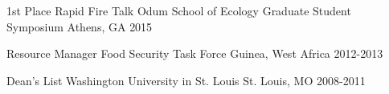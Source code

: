 



\begin{cvhonors}
  \cvhonor
    {1st Place Rapid Fire Talk} %
    {Odum School of Ecology Graduate Student Symposium} %
    {Athens, GA} %
    {2015} %

  \cvhonor
    {Resource Manager} %
    {Food Security Task Force} %
    {Guinea, West Africa} %
    {2012-2013} %

  \cvhonor
    {Dean's List} %
    {Washington University in St. Louis} %
    {St. Louis, MO} %
    {2008-2011} %

\end{cvhonors}

\medskip

